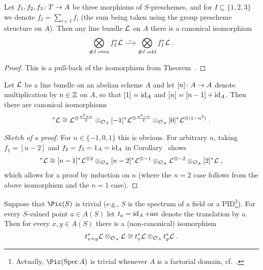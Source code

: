 \documentclass[a4paper,parskip=half,numbers=enddot, DIV=12]{scrreprt}
\begin{document}
\begin{cor}
	Let $f_1,f_2,f_3\colon T\morphism A$ be three morphisms of $S$-preschemes, and for $I\subseteq \{1,2,3\}$ we denote $f_I=\sum_{i\in I}f_i$ (the sum being taken using the group prescheme structure on $A$). Then any line bundle $\mathcal{L}$ on $A$ there is a canonical isomorphism
	\begin{align}\lbl{eq:desiredIso2}
		\bigotimes_{\#I\text{ even}}f_I^*\Ll\isomorphism \bigotimes_{\#I\text{ odd}}f_I^*\Ll\;.
	\end{align}
\end{cor}
\begin{proof}
	This is a pull-back of the isomorphism from Theorem~.
\end{proof}
\begin{cor}
	Let $\mathcal{L}$ be a line bundle on an abelian scheme $A$ and let $[n]\colon A\morphism A$ denote multiplication by $n\in \mathbb{Z}$ on $A$, so that $[1]=\operatorname{id}_A$ and $[n]=[n-1]+\operatorname{id}_A$. Then there are canonical isomorphisms
	\begin{align*}
		[n]^*\Ll\cong \Ll^{\otimes \frac{n^2+n}{2}}\otimes_{\Oo_A}[-1]^*\Ll^{\otimes\frac{n^2-n}{2}}\otimes_{\Oo_A}[0]^*\Ll^{\otimes(1-n^2)}\;.
	\end{align*}
\end{cor}
\begin{proof}[Sketch of a proof]
	For $n\in\{-1,0,1\}$ this is obvious. For arbitrary $n$, taking $f_1=[n-2]$ and $f_2=f_3=1_A=\operatorname{id}_A$ in Corollary~ shows
	\begin{align*}
		[n]^*\Ll\cong [n-1]^*\Ll^{\otimes 2}\otimes_{\Oo_A}[n-2]^*\Ll^{\otimes-1}\otimes_{\Oo_A} \Ll^{\otimes -2}\otimes_{\Oo_A}[2]^*\Ll\;,
	\end{align*}
	which allows for a proof by induction on $n$ (where the $n=2$ case follows from the above isomorphism and the $n=1$ case).
\end{proof}
\begin{cor}
	Suppose that $\Pic(S)$ is trivial (e.g., $S$ is the spectrum of a field or a PID\footnote{Actually, $\Pic(\Spec A)$ is trivial whenever $A$ is a factorial domain, cf.\ \cite[]{stacks-project}.}). For every $S$-valued point $a\in A(S)$ let $t_a=\operatorname{id}_A+a\alpha$ denote the translation by $a$. Then for every $x,y\in A(S)$ there is a (non-canonical) isomorphism
	\begin{align*}
		t_{x+y}^*\mathcal{L}\otimes_{\mathcal{O}_A}\mathcal{L}\cong t_x^*\mathcal{L}\otimes_{\mathcal{O}_A}t_y^*\mathcal{L}\;.
	\end{align*}
\end{cor}
\end{document}
